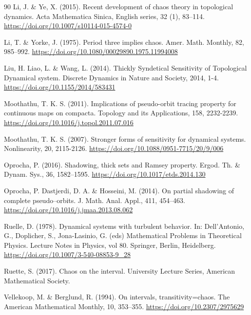 \documentclass{amsart}[12pt, papera4]
\theoremstyle{definition}
\theoremstyle{remark}
\numberwithin{equation}{section}
\begin{document}
\begin{thebibliography}{90}
		Li, J. \& Ye, X. (2015). Recent development of chaos theory in topological dynamics. Acta Mathematica Sinica, English series, 32 (1), 83--114. \url{https://doi.org/10.1007/s10114-015-4574-0}
		
		Li, T. \&  Yorke, J. (1975). Period three implies chaos. Amer. Math. Monthly, 82, 985--992. \url{https://doi.org/10.1080/00029890.1975.11994008}
		
		Liu, H. Liao, L. \& Wang, L. (2014). Thickly Syndetical Sensitivity of Topological Dynamical system. Discrete Dynamics in Nature and Society, 2014, 1-4. \url{https://doi.org/10.1155/2014/583431}
		
		Moothathu, T. K. S. (2011). Implications of pseudo-orbit tracing property for continuous maps on compacta. Topology and its Applications, 158, 2232-2239. \url{https://doi.org/10.1016/j.topol.2011.07.016}
		
		Moothathu, T. K. S. (2007). Stronger forms of sensitivity for dynamical systems. Nonlinearity, 20, 2115-2126. \url{https://doi.org/10.1088/0951-7715/20/9/006}
		
		Oprocha, P. (2016). Shadowing, thick sets and Ramsey property. Ergod. Th. \& Dynam. Sys., 36, 1582--1595. \url{https://doi.org/10.1017/etds.2014.130}
		
		Oprocha, P. Dastjerdi, D. A. \& Hosseini, M. (2014). On partial shadowing of complete pseudo--orbits. J. Math. Anal. Appl., 411, 454--463. \url{https://doi.org/10.1016/j.jmaa.2013.08.062}
		
		Ruelle, D. (1978). Dynamical systems with turbulent behavior. In: Dell'Antonio, G., Doplicher, S., Jona-Lasinio, G. (eds) Mathematical Problems in Theoretical Physics. Lecture Notes in Physics, vol 80. Springer, Berlin, Heidelberg. \url{https://doi.org/10.1007/3-540-08853-9_28}
		
		Ruette, S. (2017). Chaos on the interval. University Lecture Series, American Mathematical Society.
		
		Vellekoop, M. \& Berglund, R. (1994). On intervals, transitivity=chaos. The American Mathematical Monthly, 10, 353--355. \url{https://doi.org/10.2307/2975629}
		
		
		
		
		
	\end{thebibliography}
\end{document}
